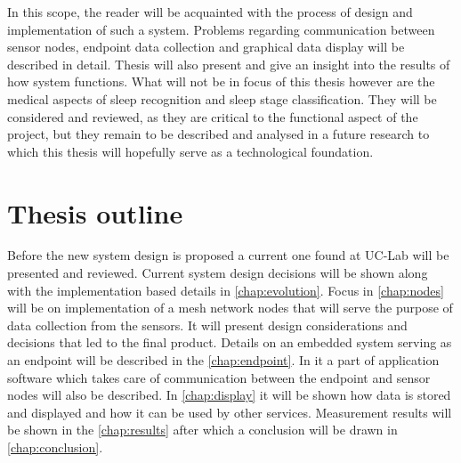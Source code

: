 In this scope, the reader will be acquainted with the process of design and implementation of such a system. Problems regarding communication between sensor nodes, endpoint data collection and graphical data display will be described in detail. Thesis will also present and give an insight into the results of how system functions. What will not be in focus of this thesis however are the medical aspects of sleep recognition and sleep stage classification. They will be considered and reviewed, as they are critical to the functional aspect of the project, but they remain to be described and analysed in a future research to which this thesis will hopefully serve as a technological foundation.


\section{Thesis outline}

Before the new system design is proposed a current one found at \ac{UC-Lab} will be presented and reviewed. Current system design decisions will be shown along with the implementation based details in \autoref{chap:evolution}. Focus in \autoref{chap:nodes} will be on implementation of a mesh network nodes that will serve the purpose of data collection from the sensors. It will present design considerations and decisions that led to the final product. Details on an embedded system serving as an endpoint will be described in the \autoref{chap:endpoint}. In it a part of application software which takes care of communication between the endpoint and sensor nodes will also be described. In \autoref{chap:display} it will be shown how data is stored and displayed and how it can be used by other services. Measurement results will be shown in the \autoref{chap:results} after which a conclusion will be drawn in \autoref{chap:conclusion}.